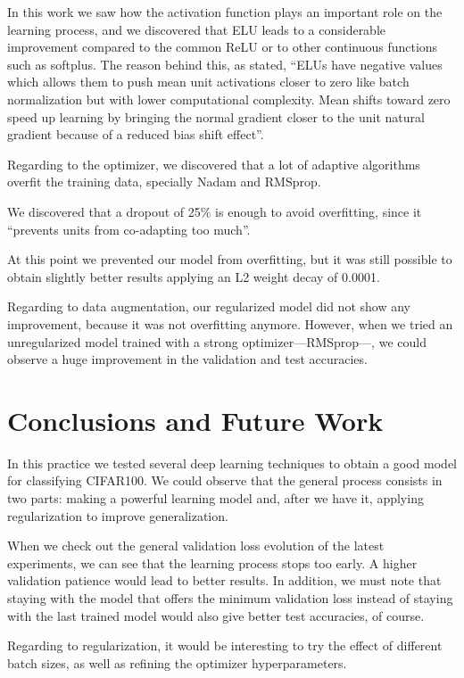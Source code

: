 \documentclass[]{article}
\begin{document}
In this work we saw how the activation function plays an important role on the learning process, and we discovered that ELU leads to a considerable improvement compared to the common ReLU or to other continuous functions such as softplus. The reason behind this, as stated, ``ELUs have negative values which allows them to push mean unit activations closer to zero like batch normalization but with lower computational complexity. Mean shifts toward zero speed up learning by bringing the normal gradient closer to the unit natural gradient because of a reduced bias shift effect''.

Regarding to the optimizer, we discovered that a lot of adaptive algorithms overfit the training data, specially Nadam and RMSprop.

We discovered that a dropout of 25\% is enough to avoid overfitting, since it ``prevents units from co-adapting too much''.

At this point we prevented our model from overfitting, but it was still possible to obtain slightly better results applying an L2 weight decay of 0.0001.

Regarding to data augmentation, our regularized model did not show any improvement, because it was not overfitting anymore. However, when we tried an unregularized model trained with a strong optimizer---RMSprop---, we could observe a huge improvement in the validation and test accuracies.

\section{Conclusions and Future Work}

In this practice we tested several deep learning techniques to obtain a good model for classifying CIFAR100. We could observe that the general process consists in two parts: making a powerful learning model and, after we have it, applying regularization to improve generalization.

When we check out the general validation loss evolution of the latest experiments, we can see that the learning process stops too early. A higher validation patience would lead to better results. In addition, we must note that staying with the model that offers the minimum validation loss instead of staying with the last trained model would also give better test accuracies, of course.

Regarding to regularization, it would be interesting to try the effect of different batch sizes, as well as refining the optimizer hyperparameters.
\end{document}

